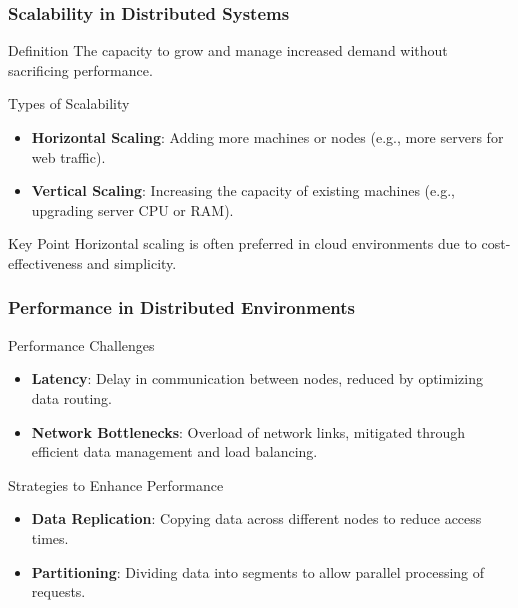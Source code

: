 \documentclass[aspectratio=169]{beamer}
\begin{document}
\begin{frame}[fragile]
    \frametitle{Scalability in Distributed Systems}
    \begin{block}{Definition}
        The capacity to grow and manage increased demand without sacrificing performance.
    \end{block}
    \begin{block}{Types of Scalability}
        \begin{itemize}
            \item \textbf{Horizontal Scaling}: Adding more machines or nodes (e.g., more servers for web traffic).
            \item \textbf{Vertical Scaling}: Increasing the capacity of existing machines (e.g., upgrading server CPU or RAM).
        \end{itemize}
    \end{block}
    \begin{block}{Key Point}
        Horizontal scaling is often preferred in cloud environments due to cost-effectiveness and simplicity.
    \end{block}
\end{frame}

\begin{frame}[fragile]
    \frametitle{Performance in Distributed Environments}
    \begin{block}{Performance Challenges}
        \begin{itemize}
            \item \textbf{Latency}: Delay in communication between nodes, reduced by optimizing data routing.
            \item \textbf{Network Bottlenecks}: Overload of network links, mitigated through efficient data management and load balancing.
        \end{itemize}
    \end{block}
    \begin{block}{Strategies to Enhance Performance}
        \begin{itemize}
            \item \textbf{Data Replication}: Copying data across different nodes to reduce access times.
            \item \textbf{Partitioning}: Dividing data into segments to allow parallel processing of requests.
        \end{itemize}
    \end{block}
\end{frame}
\end{document}
